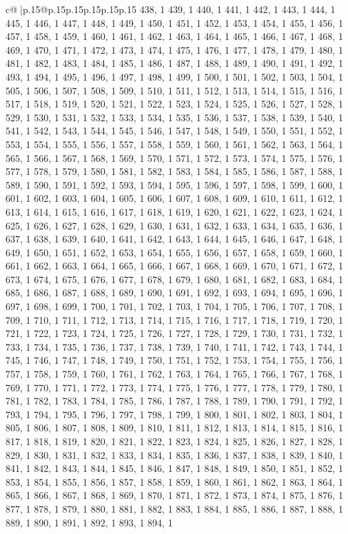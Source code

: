 \documentclass{article}
\begin{document}
{\begin{supertabular}{c@{$\;$}|p{.15\linewidth}@{}p{.15\linewidth}p{.15\linewidth}p{.15\linewidth}p{.15\linewidth}p{.15\linewidth}}
{{{438, 1 439, 1 440, 1 441, 1 442, 1 443, 1 444, 1 445, 1 446, 1 447, 1 448, 1 449, 1 450, 1 451, 1 452, 1 453, 1 454, 1 455, 1 456, 1 457, 1 458, 1 459, 1 460, 1 461, 1 462, 1 463, 1 464, 1 465, 1 466, 1 467, 1 468, 1 469, 1 470, 1 471, 1 472, 1 473, 1 474, 1 475, 1 476, 1 477, 1 478, 1 479, 1 480, 1 481, 1 482, 1 483, 1 484, 1 485, 1 486, 1 487, 1 488, 1 489, 1 490, 1 491, 1 492, 1 493, 1 494, 1 495, 1 496, 1 497, 1 498, 1 499, 1 500, 1 501, 1 502, 1 503, 1 504, 1 505, 1 506, 1 507, 1 508, 1 509, 1 510, 1 511, 1 512, 1 513, 1 514, 1 515, 1 516, 1 517, 1 518, 1 519, 1 520, 1 521, 1 522, 1 523, 1 524, 1 525, 1 526, 1 527, 1 528, 1 529, 1 530, 1 531, 1 532, 1 533, 1 534, 1 535, 1 536, 1 537, 1 538, 1 539, 1 540, 1 541, 1 542, 1 543, 1 544, 1 545, 1 546, 1 547, 1 548, 1 549, 1 550, 1 551, 1 552, 1 553, 1 554, 1 555, 1 556, 1 557, 1 558, 1 559, 1 560, 1 561, 1 562, 1 563, 1 564, 1 565, 1 566, 1 567, 1 568, 1 569, 1 570, 1 571, 1 572, 1 573, 1 574, 1 575, 1 576, 1 577, 1 578, 1 579, 1 580, 1 581, 1 582, 1 583, 1 584, 1 585, 1 586, 1 587, 1 588, 1 589, 1 590, 1 591, 1 592, 1 593, 1 594, 1 595, 1 596, 1 597, 1 598, 1 599, 1 600, 1 601, 1 602, 1 603, 1 604, 1 605, 1 606, 1 607, 1 608, 1 609, 1 610, 1 611, 1 612, 1 613, 1 614, 1 615, 1 616, 1 617, 1 618, 1 619, 1 620, 1 621, 1 622, 1 623, 1 624, 1 625, 1 626, 1 627, 1 628, 1 629, 1 630, 1 631, 1 632, 1 633, 1 634, 1 635, 1 636, 1 637, 1 638, 1 639, 1 640, 1 641, 1 642, 1 643, 1 644, 1 645, 1 646, 1 647, 1 648, 1 649, 1 650, 1 651, 1 652, 1 653, 1 654, 1 655, 1 656, 1 657, 1 658, 1 659, 1 660, 1 661, 1 662, 1 663, 1 664, 1 665, 1 666, 1 667, 1 668, 1 669, 1 670, 1 671, 1 672, 1 673, 1 674, 1 675, 1 676, 1 677, 1 678, 1 679, 1 680, 1 681, 1 682, 1 683, 1 684, 1 685, 1 686, 1 687, 1 688, 1 689, 1 690, 1 691, 1 692, 1 693, 1 694, 1 695, 1 696, 1 697, 1 698, 1 699, 1 700, 1 701, 1 702, 1 703, 1 704, 1 705, 1 706, 1 707, 1 708, 1 709, 1 710, 1 711, 1 712, 1 713, 1 714, 1 715, 1 716, 1 717, 1 718, 1 719, 1 720, 1 721, 1 722, 1 723, 1 724, 1 725, 1 726, 1 727, 1 728, 1 729, 1 730, 1 731, 1 732, 1 733, 1 734, 1 735, 1 736, 1 737, 1 738, 1 739, 1 740, 1 741, 1 742, 1 743, 1 744, 1 745, 1 746, 1 747, 1 748, 1 749, 1 750, 1 751, 1 752, 1 753, 1 754, 1 755, 1 756, 1 757, 1 758, 1 759, 1 760, 1 761, 1 762, 1 763, 1 764, 1 765, 1 766, 1 767, 1 768, 1 769, 1 770, 1 771, 1 772, 1 773, 1 774, 1 775, 1 776, 1 777, 1 778, 1 779, 1 780, 1 781, 1 782, 1 783, 1 784, 1 785, 1 786, 1 787, 1 788, 1 789, 1 790, 1 791, 1 792, 1 793, 1 794, 1 795, 1 796, 1 797, 1 798, 1 799, 1 800, 1 801, 1 802, 1 803, 1 804, 1 805, 1 806, 1 807, 1 808, 1 809, 1 810, 1 811, 1 812, 1 813, 1 814, 1 815, 1 816, 1 817, 1 818, 1 819, 1 820, 1 821, 1 822, 1 823, 1 824, 1 825, 1 826, 1 827, 1 828, 1 829, 1 830, 1 831, 1 832, 1 833, 1 834, 1 835, 1 836, 1 837, 1 838, 1 839, 1 840, 1 841, 1 842, 1 843, 1 844, 1 845, 1 846, 1 847, 1 848, 1 849, 1 850, 1 851, 1 852, 1 853, 1 854, 1 855, 1 856, 1 857, 1 858, 1 859, 1 860, 1 861, 1 862, 1 863, 1 864, 1 865, 1 866, 1 867, 1 868, 1 869, 1 870, 1 871, 1 872, 1 873, 1 874, 1 875, 1 876, 1 877, 1 878, 1 879, 1 880, 1 881, 1 882, 1 883, 1 884, 1 885, 1 886, 1 887, 1 888, 1 889, 1 890, 1 891, 1 892, 1 893, 1 894, 1 }}}
\end{supertabular}}
\end{document}
